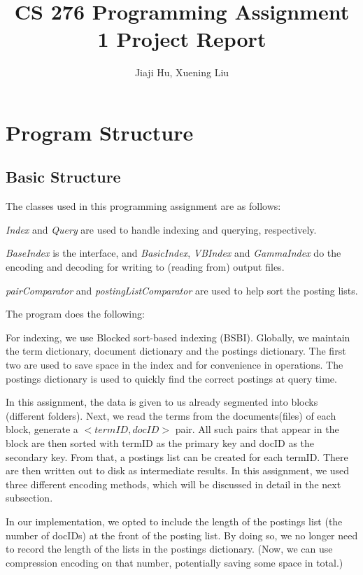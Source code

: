 \documentclass[10pt]{article}
\begin{document}
\title{CS 276 Programming Assignment 1 Project Report}
\author{Jiaji Hu, Xuening Liu}
\maketitle

\section{Program Structure}
\subsection{Basic Structure}
The classes used in this programming assignment are as follows:

{\it Index} and {\it Query} are used to handle indexing and querying, respectively.

{\it BaseIndex} is the interface, and {\it BasicIndex}, {\it VBIndex} and {\it GammaIndex} do the encoding and decoding for writing to (reading from) output files.

{\it pairComparator} and {\it postingListComparator} are used to help sort the posting lists.

The program does the following:

For indexing, we use Blocked sort-based indexing (BSBI). Globally, we maintain the term dictionary, document dictionary and the postings dictionary. The first two are used to save space in the index and for convenience in operations. The postings dictionary is used to quickly find the correct postings at query time.

In this assignment, the data is given to us already segmented into blocks (different folders). Next, we read the terms from the documents(files) of each block, generate a $<termID,docID>$ pair. All such pairs that appear in the block are then sorted with termID as the primary key and docID as the secondary key. From that, a postings list can be created for each termID. There are then written out to disk as intermediate results. In this assignment, we used three different encoding methods, which will be discussed in detail in the next subsection.

In our implementation, we opted to include the length of the postings list (the number of docIDs) at the front of the posting list. By doing so, we no longer need to record the length of the lists in the postings dictionary. (Now, we can use compression encoding on that number, potentially saving some space in total.)
\end{document}
